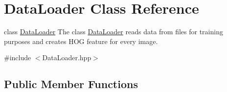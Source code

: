 \hypertarget{classDataLoader}{}\section{Data\+Loader Class Reference}
\label{classDataLoader}


class \hyperlink{classDataLoader}{Data\+Loader} The class \hyperlink{classDataLoader}{Data\+Loader} reads data from files for training purposes and creates H\+OG feature for every image.  




{\ttfamily \#include $<$Data\+Loader.\+hpp$>$}

\subsection*{Public Member Functions}
